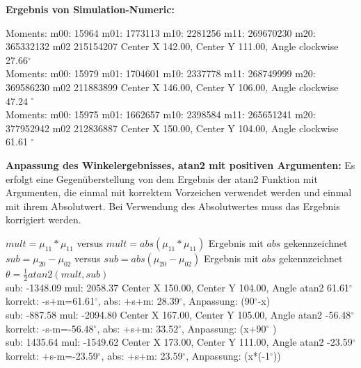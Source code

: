 \documentclass[a4paper]{report}
\begin{document}
\textbf{Ergebnis von Simulation-Numeric:}
\begin{tcolorbox}
Moments: m00: 15964 m01: 1773113 m10: 2281256 m11: 269670230 m20: 365332132 m02 215154207
Center X 142.00, Center Y 111.00, Angle clockwise 27.66$^\circ$ \\

Moments: m00: 15979 m01: 1704601 m10: 2337778 m11: 268749999 m20: 369586230 m02 211883899
Center X 146.00, Center Y 106.00, Angle clockwise 47.24 $^\circ$ \\	

Moments: m00: 15975 m01: 1662657 m10: 2398584 m11: 265651241 m20: 377952942 m02 212836887
Center X 150.00, Center Y 104.00, Angle clockwise 61.61 $^\circ$ \\
\end{tcolorbox}

\textbf{Anpassung des Winkelergebnisses, atan2 mit positiven Argumenten:}
Es erfolgt eine Gegenüberstellung von dem Ergebnis der atan2 Funktion mit Argumenten, die einmal mit korrektem Vorzeichen verwendet werden und einmal mit ihrem Absolutwert. Bei Verwendung des Absolutwertes muss das Ergebnis korrigiert werden.
\begin{tcolorbox}
$mult = \mu_{11}* \mu_{11}$ versus $mult = abs(\mu_{11}* \mu_{11})$ Ergebnis mit $abs$ gekennzeichnet\\
$sub = \mu_{20}-\mu_{02}$ versus $sub = abs(\mu_{20}-\mu_{02})$ Ergebnis mit $abs$ gekennzeichnet\\
$\theta = \frac{1}{2} atan2(mult, sub)$\\
sub: -1348.09 mul: 2058.37 Center X 150.00, Center Y 104.00, Angle atan2 61.61$^\circ$  \\
korrekt: -s+m=61.61$^\circ$, abs: +s+m: 28.39$^\circ$, Anpassung: (90$^\circ$-x)\\

sub: -887.58 mul: -2094.80 Center X 167.00, Center Y 105.00, Angle atan2 -56.48$^\circ$ \\
korrekt: -s-m=-56.48$^\circ$, abs: +s+m: 33.52$^\circ$, Anpassung: (x+90$^\circ$ )\\

sub: 1435.64 mul: -1549.62 Center X 173.00, Center Y 111.00, Angle atan2 -23.59$^\circ$ \\
korrekt: +s-m=-23.59$^\circ$, abs: +s+m: 23.59$^\circ$, Anpassung: (x*(-1$^\circ$))\\
\end{tcolorbox}
\end{document}
